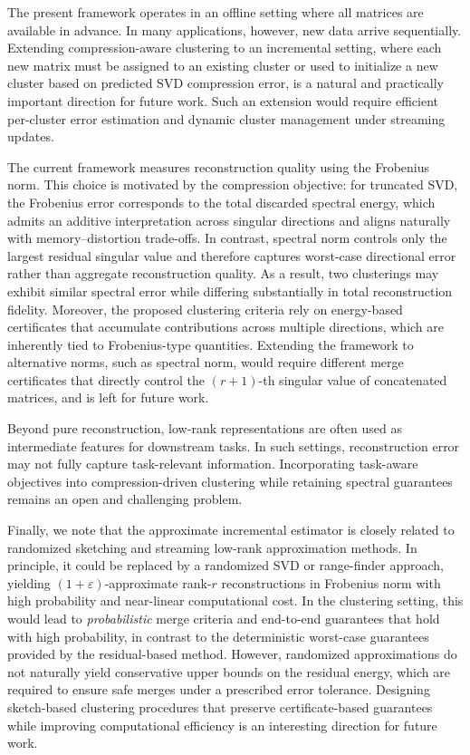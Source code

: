 \documentclass[10pt]{article} %
\begin{document}
The present framework operates in an offline setting where all matrices are available in advance.
In many applications, however, new data arrive sequentially.
Extending compression-aware clustering to an incremental setting, where each new matrix must be assigned to an existing cluster or used to initialize a new cluster based on predicted SVD compression error, is a natural and practically important direction for future work.
Such an extension would require efficient per-cluster error estimation and dynamic cluster management under streaming updates.

The current framework measures reconstruction quality using the Frobenius norm.
This choice is motivated by the compression objective: for truncated SVD, the Frobenius error corresponds to the total discarded spectral energy, which admits an additive interpretation across singular directions and aligns naturally with memory--distortion trade-offs.
In contrast, spectral norm controls only the largest residual singular value and therefore captures worst-case directional error rather than aggregate reconstruction quality.
As a result, two clusterings may exhibit similar spectral error while differing substantially in total reconstruction fidelity.
Moreover, the proposed clustering criteria rely on energy-based certificates that accumulate contributions across multiple directions, which are inherently tied to Frobenius-type quantities.
Extending the framework to alternative norms, such as spectral norm, would require different merge certificates that directly control the $(r+1)$-th singular value of concatenated matrices, and is left for future work.

Beyond pure reconstruction, low-rank representations are often used as intermediate features for downstream tasks.
In such settings, reconstruction error may not fully capture task-relevant information.
Incorporating task-aware objectives into compression-driven clustering while retaining spectral guarantees remains an open and challenging problem.

Finally, we note that the approximate incremental estimator is closely related to randomized sketching and streaming low-rank approximation methods.
In principle, it could be replaced by a randomized SVD or range-finder approach, yielding $(1+\varepsilon)$-approximate rank-$r$ reconstructions in Frobenius norm with high probability and near-linear computational cost.
In the clustering setting, this would lead to \emph{probabilistic} merge criteria and end-to-end guarantees that hold with high probability, in contrast to the deterministic worst-case guarantees provided by the residual-based method.
However, randomized approximations do not naturally yield conservative upper bounds on the residual energy, which are required to ensure safe merges under a prescribed error tolerance.
Designing sketch-based clustering procedures that preserve certificate-based guarantees while improving computational efficiency is an interesting direction for future work.
\end{document}
